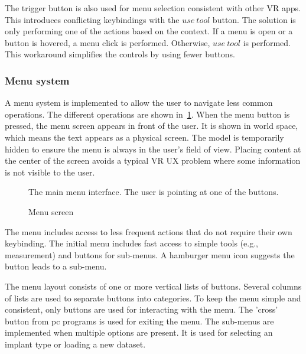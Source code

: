 \documentclass[a4paper]{report}
\begin{document}
The trigger button is also used for menu selection consistent with other VR apps. This introduces conflicting keybindings with the $use\ tool$ button. The solution is only performing one of the actions based on the context. If a menu is open or a button is hovered, a menu click is performed. Otherwise, $use\ tool$ is performed. This workaround simplifies the controls by using fewer buttons.

\subsubsection{Menu system}
A menu system is implemented to allow the user to navigate less common operations. The different operations are shown in~\ref{menu}.
When the menu button is pressed, the menu screen appears in front of the user. It is shown in world space, which means the text appears as a physical screen. The model is temporarily hidden to ensure the menu is always in the user's field of view. Placing content at the center of the screen avoids a typical VR UX problem where some information is not visible to the user.

\begin{figure}[h!]
    \centering
	\hfill
	\caption{Menu screen}\label{menu}
  \small
  The main menu interface. The user is pointing at one of the buttons.
\end{figure}

The menu includes access to less frequent actions that do not require their own keybinding. The initial menu includes fast access to simple tools (e.g., measurement) and buttons for sub-menus. A hamburger menu icon suggests the button leads to a sub-menu.

The menu layout consists of one or more vertical lists of buttons. Several columns of lists are used to separate buttons into categories. To keep the menu simple and consistent, only buttons are used for interacting with the menu. The 'cross' button from pc programs is used for exiting the menu.
The sub-menus are implemented when multiple options are present. It is used for selecting an implant type or loading a new dataset.
\end{document}
